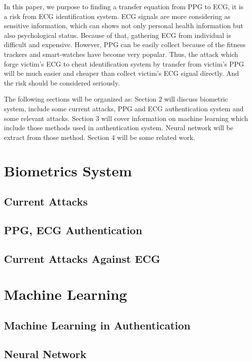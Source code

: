 \documentclass[a4paper,12pt]{article}
\begin{document}
In this paper, we purpose to finding a transfer equation from PPG to ECG, it is a risk from ECG identification system. ECG signals are more considering as sensitive information, which can shows not only personal health information but also psychological status\parencite{Damousis:2008unobtrusive}. Because of that, gathering ECG from individual is difficult and expensive. However, PPG can be easily collect because of the fitness trackers and smart-watches have become very popular\parencite{Blasco:2018feasibility}. Thus, the attack which forge victim's ECG to cheat identification system by transfer from victim's PPG will be much easier and cheaper than collect victim's ECG signal directly. And the risk should be considered seriously. 

The following sections will be organized as: Section 2 will discuss biometric system, include some current attacks, PPG and ECG authentication system and some relevant attacks. Section 3 will cover information on machine learning which include those methods used in authentication system. Neural network will be extract from those method. Section 4 will be some related work.

\section{Biometrics System}

\subsection{Current Attacks}
\subsection{PPG, ECG Authentication}
\subsection{Current Attacks Against ECG}

\section{Machine Learning}
\subsection{Machine Learning in Authentication}
\subsection{Neural Network}
\end{document}
